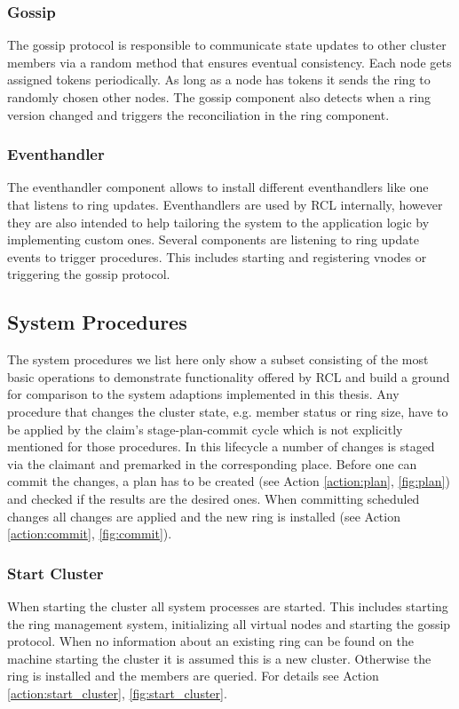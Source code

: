 \subsubsection{Gossip}
	The gossip protocol is responsible to communicate state updates to other cluster members via a random method that ensures eventual consistency.
	Each node gets assigned tokens periodically.
	As long as a node has tokens it sends the ring to randomly chosen other nodes.
	The gossip component also detects when a ring version changed and triggers the reconciliation in the ring component.

\subsubsection{Eventhandler}
	The eventhandler component allows to install different eventhandlers like one that listens to ring updates.
	Eventhandlers are used by \ac{RCL} internally, however they are also intended to help tailoring the system to the application logic by implementing custom ones.
	Several components are listening to ring update events to trigger procedures.
	This includes starting and registering vnodes or triggering the gossip protocol.

\subsection{System Procedures}
\label{sec:system_procedures}
The system procedures we list here only show a subset consisting of the most basic operations to demonstrate functionality offered by \ac{RCL} and build a ground for comparison to the system adaptions implemented in this thesis.
Any procedure that changes the cluster state, e.g. member status or ring size, have to be applied by the claim's stage-plan-commit cycle which is not explicitly mentioned for those procedures.
In this lifecycle a number of changes is staged via the claimant and premarked in the corresponding place.
Before one can commit the changes, a plan has to be created (see Action \ref{action:plan}, \cref{fig:plan}) and checked if the results are the desired ones.
When committing scheduled changes all changes are applied and the new ring is installed (see Action \ref{action:commit}, \cref{fig:commit}).

\subsubsection{Start Cluster}
When starting the cluster all system processes are started.
This includes starting the ring management system, initializing all virtual nodes and starting the gossip protocol.
When no information about an existing ring can be found on the machine starting the cluster it is assumed this is a new cluster.
Otherwise the ring is installed and the members are queried.
For details see Action \ref{action:start_cluster}, \cref{fig:start_cluster}.

